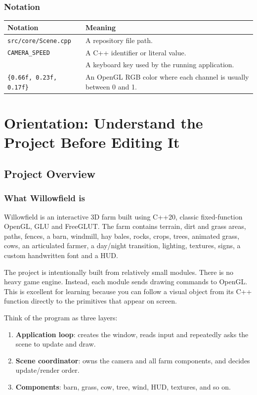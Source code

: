 \documentclass[11pt,a4paper,openany]{book}
\newcommand{\code}[1]{\texttt{#1}}
\newcommand{\file}[1]{\nolinkurl{#1}}
\newcommand{\keycap}[1]{\begingroup\setlength{\fboxsep}{0.8pt}\raisebox{0.05ex}{\fbox{\footnotesize\texttt{#1}}}\endgroup}
\newcommand{\rgb}[3]{\code{\{#1, #2, #3\}}}
\begin{document}
\section*{Notation}
\begin{tabularx}{\textwidth}{@{}lX@{}}
	\toprule
	Notation                  & Meaning                                                            \\
	\midrule
	\file{src/core/Scene.cpp} & A repository file path.                                            \\
	\code{CAMERA_SPEED}       & A C++ identifier or literal value.                                 \\
	\keycap{N}                & A keyboard key used by the running application.                    \\
	\rgb{0.66f}{0.23f}{0.17f} & An OpenGL RGB color where each channel is usually between 0 and 1. \\
	\bottomrule
\end{tabularx}

\begingroup
\small
\tableofcontents
\endgroup
\clearpage

\mainmatter
\part{Orientation: Understand the Project Before Editing It}

\chapter{Project Overview}
\section{What Willowfield is}
Willowfield is an interactive 3D farm built using C++20, classic fixed-function OpenGL, GLU and FreeGLUT. The farm contains terrain, dirt and grass areas, paths, fences, a barn, windmill, hay bales, rocks, crops, trees, animated grass, cows, an articulated farmer, a day/night transition, lighting, textures, signs, a custom handwritten font and a HUD.

The project is intentionally built from relatively small modules. There is no heavy game engine. Instead, each module sends drawing commands to OpenGL. This is excellent for learning because you can follow a visual object from its C++ function directly to the primitives that appear on screen.

\begin{beginnerbox}
	Think of the program as three layers:
	\begin{enumerate}
		\item \textbf{Application loop}: creates the window, reads input and repeatedly asks the scene to update and draw.
		\item \textbf{Scene coordinator}: owns the camera and all farm components, and decides update/render order.
		\item \textbf{Components}: barn, grass, cow, tree, wind, HUD, textures, and so on.
	\end{enumerate}
\end{beginnerbox}
\end{document}
